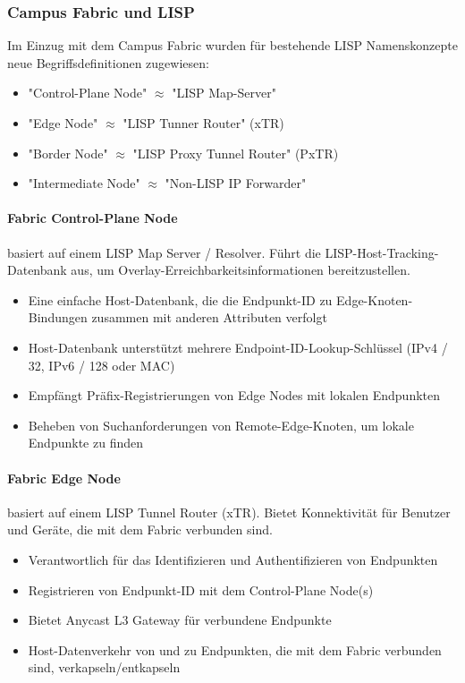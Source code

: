 \subsubsection{Campus Fabric und LISP}
Im Einzug mit dem Campus Fabric wurden für bestehende LISP Namenskonzepte neue Begriffsdefinitionen zugewiesen:
\begin{itemize}
	\item "Control-Plane Node" $\approx$ "LISP Map-Server"
	\item "Edge Node" $\approx$ "LISP Tunner Router" (xTR)
	\item "Border Node" $\approx$ "LISP Proxy Tunnel Router" (PxTR)
	\item "Intermediate Node" $\approx$ "Non-LISP IP Forwarder"
\end{itemize}

\paragraph{Fabric Control-Plane Node} basiert auf einem LISP Map Server / Resolver. Führt die LISP-Host-Tracking-Datenbank aus, um Overlay-Erreichbarkeitsinformationen bereitzustellen. 
\begin{itemize}
	\item Eine einfache Host-Datenbank, die die Endpunkt-ID zu Edge-Knoten-Bindungen zusammen mit anderen Attributen verfolgt
	\item Host-Datenbank unterstützt mehrere Endpoint-ID-Lookup-Schlüssel (IPv4 / 32, IPv6 / 128 oder MAC)
	\item Empfängt Präfix-Registrierungen von Edge Nodes mit lokalen Endpunkten
	\item Beheben von Suchanforderungen von Remote-Edge-Knoten, um lokale Endpunkte zu finden
\end{itemize}

\paragraph{Fabric Edge Node} basiert auf einem LISP Tunnel Router (xTR). Bietet Konnektivität für Benutzer und Geräte, die mit dem Fabric verbunden sind.
\begin{itemize}
	\item Verantwortlich für das Identifizieren und Authentifizieren von Endpunkten
	\item Registrieren von Endpunkt-ID mit dem Control-Plane Node(s)
	\item Bietet Anycast L3 Gateway für verbundene Endpunkte
	\item Host-Datenverkehr von und zu Endpunkten, die mit dem Fabric verbunden sind, verkapseln/entkapseln
\end{itemize}

